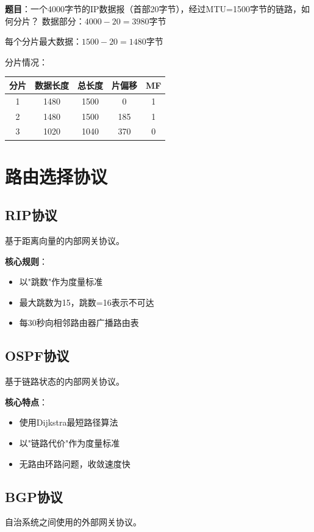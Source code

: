 \begin{examplebox}[例题4.5 IP分片]
\textbf{题目}：一个4000字节的IP数据报（首部20字节），经过MTU=1500字节的链路，如何分片？
\tcblower
数据部分：$4000 - 20 = 3980$字节

每个分片最大数据：$1500 - 20 = 1480$字节

分片情况：
\begin{center}\small
\begin{tabular}{|c|c|c|c|c|}
\hline
分片 & 数据长度 & 总长度 & 片偏移 & MF \\
\hline
1 & 1480 & 1500 & 0 & 1 \\
2 & 1480 & 1500 & 185 & 1 \\
3 & 1020 & 1040 & 370 & 0 \\
\hline
\end{tabular}
\end{center}
\end{examplebox}

\section{路由选择协议}
\subsection{RIP协议}
基于距离向量的内部网关协议。

\textbf{核心规则}：
\begin{itemize}[leftmargin=2em,itemsep=0pt]
    \item 以"跳数"作为度量标准
    \item 最大跳数为15，跳数=16表示不可达
    \item 每30秒向相邻路由器广播路由表
\end{itemize}

\subsection{OSPF协议}
基于链路状态的内部网关协议。

\textbf{核心特点}：
\begin{itemize}[leftmargin=2em,itemsep=0pt]
    \item 使用Dijkstra最短路径算法
    \item 以"链路代价"作为度量标准
    \item 无路由环路问题，收敛速度快
\end{itemize}

\subsection{BGP协议}
自治系统之间使用的外部网关协议。

